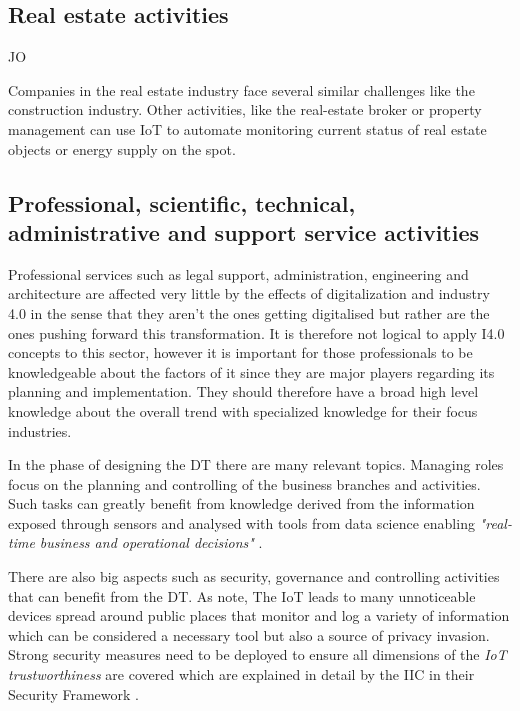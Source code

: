 \subsection{Real estate activities}
JO

Companies in the real estate industry face several similar challenges like the construction industry. Other activities, like the real-estate broker or property management can use \ac{IoT} to automate monitoring current status of real estate objects or energy supply on the spot.

\subsection{Professional, scientific, technical, administrative and support service activities}

Professional services such as legal support, administration, engineering and architecture are affected very little by the effects of digitalization and industry 4.0 in the sense that they aren't the ones getting digitalised but rather are the ones pushing forward this transformation. It is therefore not logical to apply \ac{I4.0} concepts to this sector, however it is important for those professionals to be knowledgeable about the factors of it since they are major players regarding its planning and implementation. They should therefore have a broad high level knowledge about the overall trend with specialized knowledge for their focus industries. 

In the phase of designing the \ac{DT} there are many relevant topics. Managing roles focus on the planning and controlling of the business branches and activities. Such tasks can greatly benefit from knowledge derived from the information exposed through sensors and analysed with tools from data science enabling \emph{"real-time business and operational decisions"} \cite[p.84]{iicarchitecture:2016}. 

There are also big aspects such as security, governance and controlling activities that can benefit from the \ac{DT}. As \citeauthor{Tragos2016trusted} note, The \ac{IoT} leads to many unnoticeable devices spread around public places that monitor and log a variety of information which can be considered a necessary tool but also a source of privacy invasion. Strong security measures need to be deployed to ensure all dimensions of the \emph{\ac{IoT} trustworthiness} are covered which are explained in detail by the \ac{IIC} in their Security Framework \cite{iicsecurity:2016}. 

